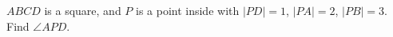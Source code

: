 $ABCD$ is a square, and $P$ is a point inside with $|PD| = 1$, $|PA| = 2$, $|PB| = 3$. Find $\angle APD$.
